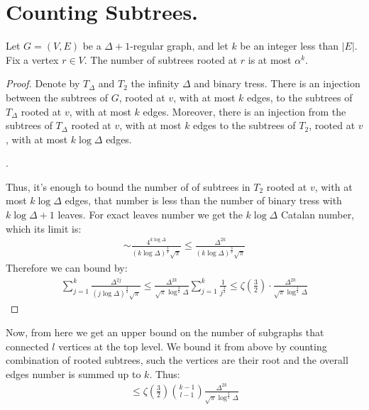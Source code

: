 
   \section{Counting Subtrees.} 

  \begin{claim}
    \label{claim:counting_trees}
    Let $G = \left( V, E \right)$ be a $\Delta + 1$-regular graph, and let $k$ be an integer less than $|E|$. Fix a vertex $r \in V$. The number of subtrees rooted at $r$ is at most $\alpha^{k}$.
  \end{claim}


  \begin{proof}
    Denote by $T_{\Delta}$ and $T_{2}$ the infinity $\Delta$ and binary tress. There is an injection between the subtrees of $G$, rooted at $v$, with at most $k$ edges, to the subtrees of $T_{\Delta}$ rooted at $v$, with at most $k$ edges. Moreover, there is an injection from the subtrees of $T_{\Delta}$ rooted at $v$, with at most $k$ edges to the subtrees of $T_{2}$, rooted at $v$, with at most $k \log \Delta$ edges. 

    . 

    Thus, it's enough to bound the number of of subtrees in $T_{2}$ rooted at $v$, with at most $ k \log \Delta $ edges, that number is less than the number of binary tress with $k \log \Delta + 1$ leaves. For exact leaves number we get the $k \log \Delta$ Catalan number, which its limit is:   
    \begin{equation*}
      \begin{split}
          \sim \frac{4^{k \log \Delta}}{\left( k \log \Delta \right)^{\frac{3}{2}} \sqrt{\pi} } \le \frac{\Delta^{2k}}{\left( k \log \Delta \right)^{\frac{3}{2}} \sqrt{\pi} } 
      \end{split}
    \end{equation*}
    Therefore we can bound by:
    \begin{equation*}
      \begin{split}
        \sum_{j=1}^{k} \frac{\Delta^{2j}}{\left( j \log \Delta \right)^{\frac{3}{2}} \sqrt{\pi} }  \le \frac{\Delta^{2k}}{\sqrt{\pi}\log^{\frac{3}{2}} \Delta}\sum_{j=1}^{k} \frac{1}{ j^{\frac{3}{2}} }  \le \zeta (\frac{3}{2}) \cdot \frac{\Delta^{2k}}{\sqrt{\pi}\log^{\frac{3}{2}} \Delta}
      \end{split}
    \end{equation*}

  \end{proof}
  Now, from here we get an upper bound on the number of subgraphs that connected $l$ vertices at the top level. We bound it from above by counting combination of rooted subtrees, such the vertices are their root and the overall edges number is summed up to $k$. Thus: 
  \begin{equation*}
    \begin{split}
      \le \zeta (\frac{3}{2}) { k - 1 \choose l - 1 } \frac{\Delta^{2k}}{\sqrt{\pi}\log^{\frac{3}{2}} \Delta}
    \end{split}
  \end{equation*}

